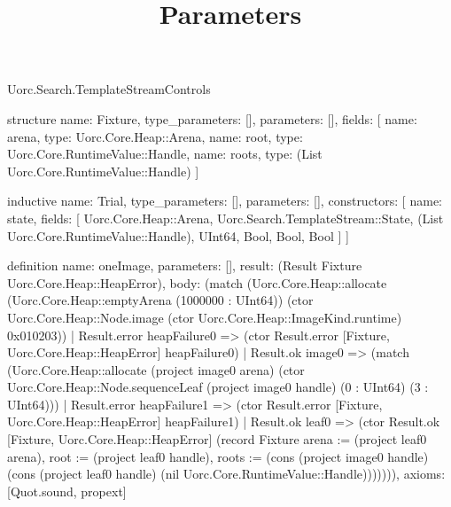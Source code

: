 \begin{lexlean}{Uorc.Search.TemplateStreamControls}
\title{Parameters}
\begin{semanticmodule}
structure{
  name: Fixture,
  type_parameters: [],
  parameters: [],
  fields: [
    {name: arena, type: Uorc.Core.Heap::Arena},
    {name: root, type: Uorc.Core.RuntimeValue::Handle},
    {name: roots, type: (List Uorc.Core.RuntimeValue::Handle)}
  ]
}

inductive{
  name: Trial,
  type_parameters: [],
  parameters: [],
  constructors: [
    {
      name: state,
      fields: [
        Uorc.Core.Heap::Arena,
        Uorc.Search.TemplateStream::State,
        (List Uorc.Core.RuntimeValue::Handle),
        UInt64,
        Bool,
        Bool,
        Bool
      ]
    }
  ]
}

definition{
  name: oneImage,
  parameters: [],
  result: (Result Fixture Uorc.Core.Heap::HeapError),
  body: (match (Uorc.Core.Heap::allocate (Uorc.Core.Heap::emptyArena (1000000 : UInt64)) (ctor Uorc.Core.Heap::Node.image (ctor Uorc.Core.Heap::ImageKind.runtime) 0x010203))
    | Result.error heapFailure0 => (ctor Result.error [Fixture, Uorc.Core.Heap::HeapError] heapFailure0)
    | Result.ok image0 => (match (Uorc.Core.Heap::allocate (project image0 arena) (ctor Uorc.Core.Heap::Node.sequenceLeaf (project image0 handle) (0 : UInt64) (3 : UInt64)))
      | Result.error heapFailure1 => (ctor Result.error [Fixture, Uorc.Core.Heap::HeapError] heapFailure1)
      | Result.ok leaf0 => (ctor Result.ok [Fixture, Uorc.Core.Heap::HeapError] (record Fixture {arena := (project leaf0 arena), root := (project leaf0 handle), roots := (cons (project image0 handle) (cons (project leaf0 handle) (nil Uorc.Core.RuntimeValue::Handle)))})))),
  axioms: [Quot.sound, propext]
}


\end{semanticmodule}
\end{lexlean}
